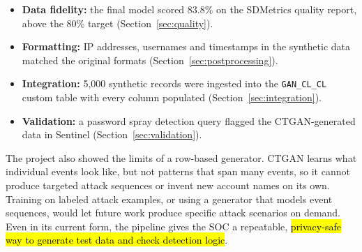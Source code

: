 \documentclass[11pt,a4paper]{article}
\begin{document}
\begin{itemize}
  \item \textbf{Data fidelity:} the final model scored 83.8\% on the SDMetrics quality report, above the 80\% target (Section~\ref{sec:quality}).
  \item \textbf{Formatting:} IP addresses, usernames and timestamps in the synthetic data matched the original formats (Section~\ref{sec:postprocessing}).
  \item \textbf{Integration:} 5,000 synthetic records were ingested into the \texttt{GAN\_CL\_CL} custom table with every column populated (Section~\ref{sec:integration}).
  \item \textbf{Validation:} a password spray detection query flagged the CTGAN-generated data in Sentinel (Section~\ref{sec:validation}).
\end{itemize}

The project also showed the limits of a row-based generator. CTGAN learns what individual events look like, but not patterns that span many events, so it cannot produce targeted attack sequences or invent new account names on its own. Training on labeled attack examples, or using a generator that models event sequences, would let future work produce specific attack scenarios on demand. Even in its current form, the pipeline gives the SOC a repeatable, \hl{privacy-safe way to generate test data and check detection logic}.
\end{document}
